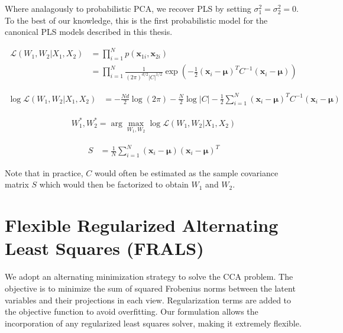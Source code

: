 Where analagously to probabilistic PCA\cite{tipping1999probabilistic}, we recover PLS by setting $\sigma_1^2 = \sigma
_2^2 = 0$.
To the best of our knowledge, this is the first probabilistic model for the canonical PLS models described in this
thesis.

\begin{align*}
\mathcal{L}(W_1, W_2 | X_1, X_2) &= \prod_{i=1}^{N} p(\mathbf{x}_{1i}, \mathbf{x}_{2i}) \\
&= \prod_{i=1}^{N} \frac{1}{(2\pi)^{d/2} |C|^{1/2}} \exp \left( -\frac{1}{2} (\mathbf{x}_i - \boldsymbol{\mu})^T C^{-1} (\mathbf{x}_i - \boldsymbol{\mu}) \right)
\end{align*}

\begin{align*}
\log \mathcal{L}(W_1, W_2 | X_1, X_2) &= -\frac{Nd}{2} \log(2\pi) - \frac{N}{2} \log |C| - \frac{1}{2} \sum_{i=1}^{N} (\mathbf{x}_i - \boldsymbol{\mu})^T C^{-1} (\mathbf{x}_i - \boldsymbol{\mu})
\end{align*}

\begin{align*}
W_1^*, W_2^* = \arg\max_{W_1, W_2} \log \mathcal{L}(W_1, W_2 | X_1, X_2)
\end{align*}

\begin{align*}
S &= \frac{1}{N} \sum_{i=1}^N (\mathbf{x}_i - \boldsymbol{\mu})(\mathbf{x}_i - \boldsymbol{\mu})^T
\end{align*}

Note that in practice, \( C \) would often be estimated as the sample covariance matrix \( S \) which would then be factorized to obtain \( W_1 \) and \( W_2 \).



\subsection{}

\section{Flexible Regularized Alternating Least Squares (FRALS)}\label{subsec:flexible-regularized-alternating-least-squares-(frals)}
We adopt an alternating minimization strategy to solve the CCA problem.
The objective is to minimize the sum of squared Frobenius norms between the latent variables and their projections in each view.
Regularization terms are added to the objective function to avoid overfitting.
Our formulation allows the incorporation of any regularized least squares solver, making it extremely flexible.

